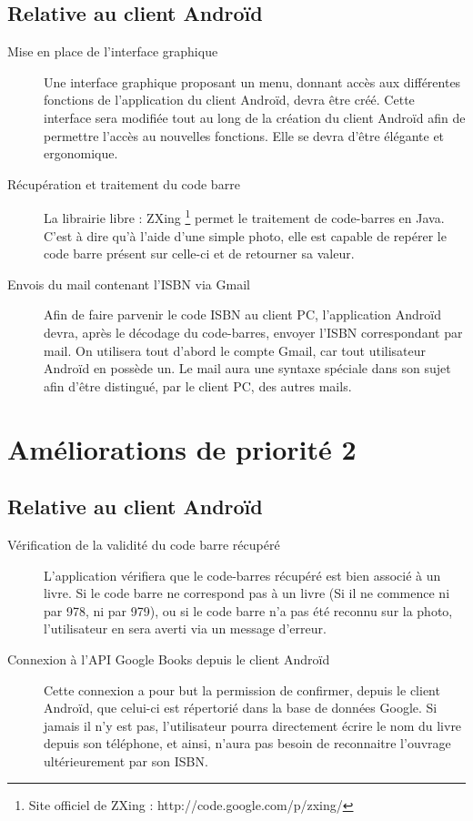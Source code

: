 \subsection{Relative au client Androïd}
\begin{description}

\item[Mise en place de l'interface graphique]
	Une interface graphique proposant un menu, donnant accès aux différentes fonctions de l'application du client Androïd, devra être créé. 
	Cette interface sera modifiée tout au long de la création du client Androïd afin de permettre l'accès au nouvelles fonctions.
	Elle se devra d'être élégante et ergonomique.

\item[Récupération et traitement du code barre]
	La librairie libre : ZXing \footnote{Site officiel de ZXing : http://code.google.com/p/zxing/} 
	permet le traitement de code-barres en Java. 
	C'est à dire qu'à l'aide d'une simple photo, elle est capable de repérer le code barre présent sur celle-ci et de retourner sa valeur.

\item[Envois du mail contenant l'ISBN via Gmail]
	Afin de faire parvenir le code ISBN au client PC, l'application Androïd devra, après le décodage du code-barres, envoyer l'ISBN correspondant par mail. 
	On utilisera tout d'abord le compte Gmail, car tout utilisateur Androïd en possède un. 
	Le mail aura une syntaxe spéciale dans son sujet afin d'être distingué, par le client PC, des autres mails.

\end{description}

\section{Améliorations de priorité 2}

\subsection{Relative au client Androïd}

\begin{description}

\item[Vérification de la validité du code barre récupéré]
	L'application vérifiera que le code-barres récupéré est bien associé à un livre. 
	Si le code barre ne correspond pas à un livre (Si il ne commence ni par 978, ni par 979), ou si le code barre n'a pas été reconnu sur la photo, l'utilisateur en sera averti via un message d'erreur.

\item[Connexion à l'API Google Books depuis le client Androïd]
	Cette connexion a pour but la permission de confirmer, depuis le client Androïd, que celui-ci est répertorié dans la base de données Google. 
	Si jamais il n'y est pas, l'utilisateur pourra directement écrire le nom du livre depuis son téléphone, et ainsi, n'aura pas besoin de reconnaitre l'ouvrage ultérieurement par son ISBN.

\end{description}

